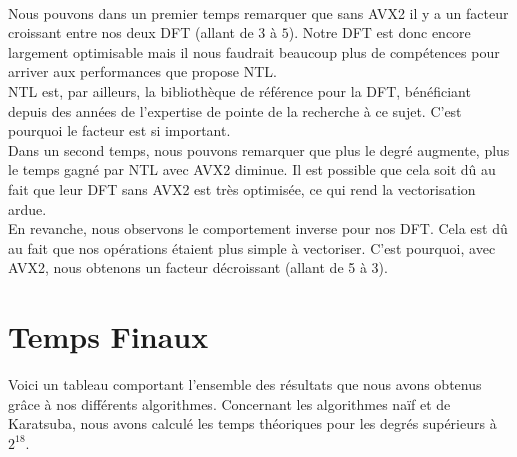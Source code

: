 \documentclass[12pt, a4paper]{article}
\begin{document}
\ \\
\indent Nous pouvons dans un premier temps remarquer que sans AVX2 il y a un facteur croissant entre nos deux DFT (allant de $3$ à $5$). Notre DFT est donc encore largement optimisable mais il nous faudrait beaucoup plus de compétences pour arriver aux performances que propose NTL. \\ 
NTL est, par ailleurs, la bibliothèque de référence pour la DFT, bénéficiant depuis des années de l'expertise de pointe de la recherche à ce sujet. C'est pourquoi le facteur est si important. \\
\indent Dans un second temps, nous pouvons remarquer que plus le degré augmente, plus le temps gagné par NTL avec AVX2 diminue. Il est possible que cela soit dû au fait que leur DFT sans AVX2 est très optimisée, ce qui rend la vectorisation ardue.\\ 
\indent En revanche, nous observons le comportement inverse pour nos DFT. Cela est dû au fait que nos opérations étaient plus simple à vectoriser. C'est pourquoi, avec AVX2, nous obtenons un facteur décroissant (allant de 5 à 3).

\newpage

\section{Temps Finaux}

Voici un tableau comportant l'ensemble des résultats que nous avons obtenus grâce à nos différents algorithmes.
Concernant les algorithmes naïf et de Karatsuba, nous avons calculé les temps théoriques pour les degrés supérieurs à $2^{18}$. 
\end{document}
